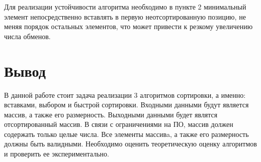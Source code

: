 Для реализации устойчивости алгоритма необходимо в пункте 2 минимальный элемент непосредственно вставлять в первую неотсортированную позицию, не меняя порядок остальных элементов, что может привести к резкому увеличению числа обменов. 

\section*{Вывод}
В данной работе стоит задача реализации 3 алгоритмов сортировки, а именно: вставками, выбором и быстрой сортировки.
Входными данными будут является массив, а также его размерность. Выходными данными будет являтся отсортированный массив. В связи с ограничениями на ПО, массив должен содержать только целые числа. Все элементы массивa, а также его размерность должны быть валидными. 
Необходимо оценить теоретическую оценку алгоритмов и проверить ее экспериментально. 
